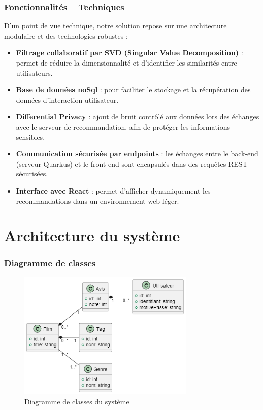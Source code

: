 \documentclass{beamer}
\begin{document}
\begin{frame}
    \frametitle{Fonctionnalités – Techniques}
    \small
    D’un point de vue technique, notre solution repose sur une architecture modulaire et des technologies robustes :

    \begin{itemize}
        \item \textbf{Filtrage collaboratif par SVD (Singular Value Decomposition)} : permet de réduire la dimensionnalité et d’identifier les similarités entre utilisateurs.
        \item \textbf{Base de données noSql} : pour faciliter le stockage et la récupération des données d’interaction utilisateur.
        \item \textbf{Differential Privacy} : ajout de bruit contrôlé aux données lors des échanges avec le serveur de recommandation, afin de protéger les informations sensibles.
        \item \textbf{Communication sécurisée par endpoints} : les échanges entre le back-end (serveur Quarkus) et le front-end sont encapsulés dans des requêtes REST sécurisées.
        \item \textbf{Interface avec React} : permet d’afficher dynamiquement les recommandations dans un environnement web léger.
    \end{itemize}

\end{frame}



\section{Architecture du système}
\begin{frame}
    \frametitle{Diagramme de classes}
        \vspace{0.5cm}
    \begin{figure}
        \centering
        \includegraphics[width=0.75\textwidth]{classe.png}
        \caption{\small Diagramme de classes du système}
    \end{figure}
\end{frame}
\end{document}
